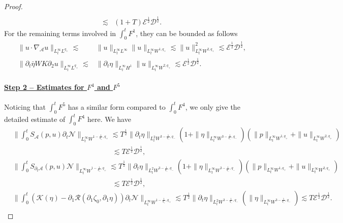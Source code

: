 \documentclass[letterpaper,reqno,10pt,twoside]{amsart}
\theoremstyle{definition}
\theoremstyle{remark}
\def\p{\partial}
\begin{document}
\begin{proof}
\[\begin{aligned}
				\\
				\lesssim&(1+T)\mathscr{E}^{\frac{1}{2}}\mathscr{D}^{\frac{1}{2}}.
			\end{aligned}
			\]
			For the remaining terms involved in $\int_{0}^{t}F^{1}$, they can be bounded as follows
			\[
			\begin{aligned}
				\|u\cdot \nabla_{\mathcal{A}}u\|_{L_{t}^{\infty}L^{q_{+}}}\lesssim&\|u\|_{L_{t}^{\infty}L^{\infty}}\|u\|_{L_{t}^{\infty}W^{1,q_{+}}}\lesssim\|u\|_{L_{t}^{\infty}W^{2,q_{+}}}^{2}\lesssim\mathscr{E}^{\frac{1}{2}}\mathscr{D}^{\frac{1}{2}},\\
				\|\p_{t}\bar{\eta}WK\p_{2}u\|_{L_{t}^{\infty}L^{q_{+}}}\lesssim&\|\p_{t}\eta\|_{L_{t}^{\infty}H^{1}}\|u\|_{L_{t}^{\infty}W^{2,q_{+}}}\lesssim \mathscr{E}^{\frac{1}{2}}\mathscr{D}^{\frac{1}{2}}.
			\end{aligned}
			\]
			
			\paragraph{\underline{Step 2 -- Estimates for $F^{4}$ and $F^5$}} 
			Noticing that $\int_{0}^{t}F^{5}$ has a similar form compared to $\int_{0}^{t}F^{4}$, we only give the detailed estimate of $\int_{0}^{t}F^{4}$ here. We have
			\[
			\begin{aligned}
				&\|\int_{0}^{t}S_{\mathcal{A}}(p,u)\p_{t}\mathcal{N}\|_{L_{t}^{\infty}W^{1-\frac{1}{q_{+}},q_{+}}}
				\lesssim T^{\frac{1}{2}}\|\p_{t}{\eta}\|_{L_{t}^{2}W^{3-\frac{1}{q_{-}},q_{-}}}(1+\|\eta\|_{L_{t}^{\infty}W^{3-\frac{1}{q_{-}},q_{-}}})(\|p\|_{L_{t}^{\infty}W^{1,q_{+}}}+\|u\|_{L_{t}^{\infty}W^{2,q_{+}}})\\
				& \qquad \qquad \qquad \qquad\qquad\qquad\qquad\lesssim T\mathscr{E}^{\frac{1}{2}}\mathscr{D}^{\frac{1}{2}},\\
				&\|\int_{0}^{t}S_{\p_{t}\mathcal{A}}(p,u)\mathcal{N}\|_{L_{t}^{\infty}W^{1-\frac{1}{q_{+}},q_{+}}}\lesssim T^{\frac{1}{2}}\|\p_{t}{\eta}\|_{L_{t}^{2}W^{3-\frac{1}{q_{-}},q_{-}}}(1+\|\eta\|_{L_{t}^{\infty}W^{3-\frac{1}{q_{-}},q_{-}}})(\|p\|_{L_{t}^{\infty}W^{1,q_{+}}}+\|u\|_{L_{t}^{\infty}W^{2,q_{+}}})\\
				& \qquad \qquad \qquad \qquad\qquad\qquad\qquad\lesssim T\mathscr{E}^{\frac{1}{2}}\mathscr{D}^{\frac{1}{2}},\\
				&\|\int_{0}^{t}(\mathcal{K}(\eta)-\p_{1}\mathcal{R}(\p_{1}\zeta_{0},\p_{1}\eta))\p_{t}\mathcal{N}\|_{L_{t}^{\infty}W^{1-\frac{1}{q_{+}},q_{+}}}\lesssim T^{\frac{1}{2}}\|\p_{t}{\eta}\|_{L_{t}^{2}W^{3-\frac{1}{q_{-}},q_{-}}}(\|\eta\|_{L_{t}^{\infty}W^{3-\frac{1}{q_{-}},q_{-}}})
				\lesssim T\mathscr{E}^{\frac{1}{2}}\mathscr{D}^{\frac{1}{2}}.\\
			\end{aligned}
			\]
			

\end{proof}
\end{document}

